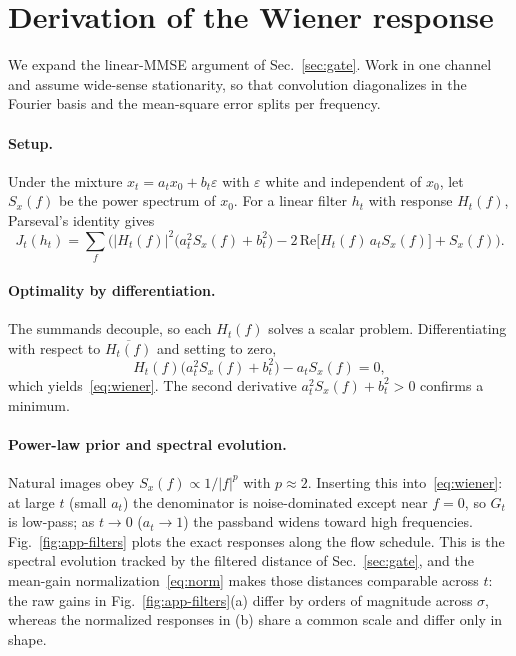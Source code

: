 \section{Derivation of the Wiener response}
\label{app:wiener}

We expand the linear-MMSE argument of Sec.~\ref{sec:gate}. Work in one
channel and assume wide-sense stationarity, so that convolution
diagonalizes in the Fourier basis and the mean-square error splits per
frequency.

\paragraph{Setup.} Under the mixture $x_t = a_t x_0 + b_t \varepsilon$ with
$\varepsilon$ white and independent of $x_0$, let $S_x(f)$ be the power
spectrum of $x_0$. For a linear filter $h_t$ with response $H_t(f)$,
Parseval's identity gives
\begin{equation}
  J_t(h_t) = \sum_f \Big(
  |H_t(f)|^2\big(a_t^2 S_x(f) + b_t^2\big)
  - 2\,\mathrm{Re}\big[H_t(f)\,a_t S_x(f)\big]
  + S_x(f)\Big).
  \label{eq:app-mse}
\end{equation}

\paragraph{Optimality by differentiation.} The summands decouple, so each
$H_t(f)$ solves a scalar problem. Differentiating with respect to
$\overline{H_t(f)}$ and setting to zero,
\begin{equation}
  H_t(f)\big(a_t^2 S_x(f) + b_t^2\big) - a_t S_x(f) = 0,
\end{equation}
which yields~\eqref{eq:wiener}. The second derivative
$a_t^2 S_x(f) + b_t^2 > 0$ confirms a minimum.

\paragraph{Power-law prior and spectral evolution.}
Natural images obey $S_x(f) \propto 1/|f|^p$ with $p \approx 2$.
Inserting this into~\eqref{eq:wiener}: at large $t$ (small $a_t$) the
denominator is noise-dominated except near $f = 0$, so $G_t$ is low-pass;
as $t \to 0$ ($a_t \to 1$) the passband widens toward high frequencies.
Fig.~\ref{fig:app-filters} plots the exact responses along the flow
schedule. This is the spectral evolution tracked by the filtered
distance of Sec.~\ref{sec:gate}, and the mean-gain
normalization~\eqref{eq:norm} makes those distances comparable across
$t$: the raw gains in Fig.~\ref{fig:app-filters}(a) differ by orders of
magnitude across $\sigma$, whereas the normalized responses in (b) share
a common scale and differ only in shape.

